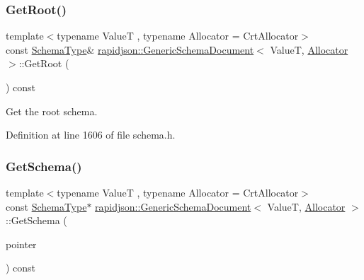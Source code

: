 \subsubsection{\texorpdfstring{GetRoot()}{GetRoot()}}
{\footnotesize\ttfamily template$<$typename ValueT , typename Allocator  = Crt\+Allocator$>$ \\
const \mbox{\hyperlink{classrapidjson_1_1_generic_schema_document_aaf4e7f371de938025f7ed4be3b83266e}{Schema\+Type}}\& \mbox{\hyperlink{classrapidjson_1_1_generic_schema_document}{rapidjson\+::\+Generic\+Schema\+Document}}$<$ ValueT, \mbox{\hyperlink{classrapidjson_1_1_allocator}{Allocator}} $>$\+::Get\+Root (\begin{DoxyParamCaption}{ }\end{DoxyParamCaption}) const}



Get the root schema. 



Definition at line 1606 of file schema.\+h.


\begin{DoxyCode}{0}

\end{DoxyCode}
\mbox{\label{classrapidjson_1_1_generic_schema_document_ae577eb9833e3a194ecb6b832434bd67d}} 
\subsubsection{\texorpdfstring{GetSchema()}{GetSchema()}}
{\footnotesize\ttfamily template$<$typename ValueT , typename Allocator  = Crt\+Allocator$>$ \\
const \mbox{\hyperlink{classrapidjson_1_1_generic_schema_document_aaf4e7f371de938025f7ed4be3b83266e}{Schema\+Type}}$\ast$ \mbox{\hyperlink{classrapidjson_1_1_generic_schema_document}{rapidjson\+::\+Generic\+Schema\+Document}}$<$ ValueT, \mbox{\hyperlink{classrapidjson_1_1_allocator}{Allocator}} $>$\+::Get\+Schema (\begin{DoxyParamCaption}\item[{const \mbox{\hyperlink{classrapidjson_1_1_generic_schema_document_a61540c0f8aa542760ae03257a0e6dab7}{Pointer\+Type}} \&}]{pointer }\end{DoxyParamCaption}) const\hspace{0.3cm}{\ttfamily [private]}}



